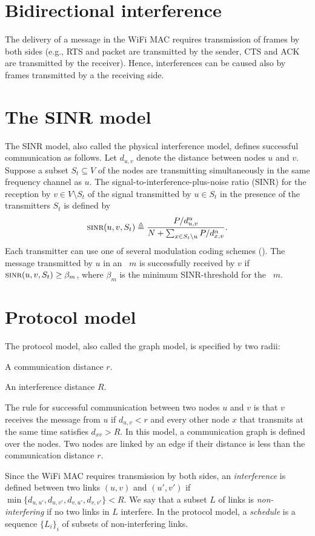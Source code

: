 \documentclass[12pt,oneside,english,a4paper]{book}
\theoremstyle{plain}
\theoremstyle{definition}
\theoremstyle{Theorem}
\theoremstyle{plain}
\newenvironment{proof sketch}[1]{\noindent {\emph{Proof sketch of #1:}}}{\hfill \qed}
\newcommand{\eqdf}{\triangleq}
\newcommand{\SINR}{\text{\sc{sinr}}}
\newcommand{\MCS}{\text{\sc{mcs}}}
\begin{document}
\section{Bidirectional interference}
The delivery of a message in the WiFi MAC requires transmission of
frames by both sides (e.g., RTS and packet are transmitted by the
sender, CTS and ACK are transmitted by the receiver). Hence,
interferences can be caused also by frames transmitted by a the
receiving side.

\section{The SINR model}
The SINR model, also called the physical
interference model, defines successful communication as follows.  Let
$d_{u,v}$ denote the distance between nodes $u$ and $v$.  Suppose a subset
$S_t\subseteq V$ of the nodes are transmitting simultaneously in the
same frequency channel as $u$.  The signal-to-interference-plus-noise
ratio (SINR) for the reception by $v\in V\setminus S_t$ of the signal
transmitted by $u\in S_t$ in the presence of the transmitters $S_t$ is
defined by
\[
\SINR(u,v,S_t) \eqdf \frac{P/d_{u,v}^{\alpha}}{N+\sum_{x\in
    S_t\setminus{u}} P/d_{x,v}^{\alpha}}.
\]
Each transmitter can use one of several modulation coding schemes (\MCS).
The message transmitted by $u$ in an \MCS\ $m$ is successfully received by
$v$ if $\SINR(u,v,S_t)\geq \beta_m$, where $\beta_m$ is the minimum
SINR-threshold for the \MCS\ $m$.

\section{Protocol model}
The protocol model, also called the graph model, is specified by two
radii:
\begin{inparaenum}[(i)]
\item A communication distance $r$.
\item An interference distance $R$.
\end{inparaenum}
The rule for successful communication between two nodes $u$ and $v$ is
that $v$ receives the message from $u$ if $d_{u,v}<r$ and every other node
$x$ that transmits at the same time satisfies $d_{xv}> R$.  In this
model, a communication graph is defined over the nodes.  Two nodes are
linked by an edge if their distance is less than the communication
distance $r$.

Since the WiFi MAC requires transmission by both sides, an
\emph{interference} is defined between two links $(u,v)$ and $(u',v')$
if $\min\{d_{u,u'},d_{u,v'}, d_{v,u'}, d_{v,v'}\} < R$.  We say that a
subset $L$ of links is \emph{non-interfering} if no two links in $L$
interfere.  In the protocol model, a \emph{schedule} is a sequence
$\{L_i\}_i$ of subsets of non-interfering links.
\end{document}
